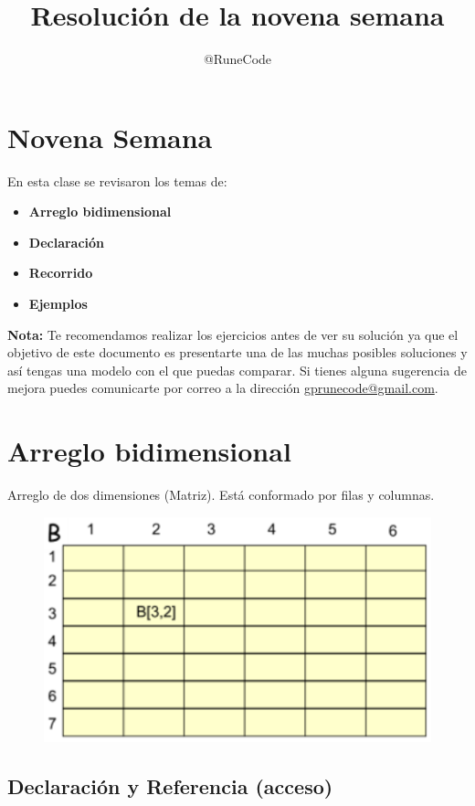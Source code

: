 \documentclass{article}
\title{Resolución de la novena semana}
\author{@RuneCode}
\begin{document}



\section*{Novena Semana}%
En esta clase se revisaron los temas de:
\begin{itemize}
\item \textbf{Arreglo bidimensional}
\item \textbf{Declaración}
\item \textbf{Recorrido}
\item \textbf{Ejemplos}
\end{itemize}
\vspace{1cm}
\textbf{Nota:} Te recomendamos realizar los ejercicios antes de ver su solución
ya que el objetivo de este documento es presentarte una de las muchas posibles
soluciones y así tengas una modelo con el que puedas comparar. Si tienes alguna
sugerencia de mejora puedes comunicarte por correo a la dirección
\href{mailto:gprunecode@gmail.com}{gprunecode@gmail.com}.


\section{Arreglo bidimensional}%
Arreglo de dos dimensiones (Matriz). Está conformado por filas y columnas.

\begin{figure}[h!]
  \centering
  \includegraphics[scale=0.75]{./pictures/arreglo_bidimensional.png}
\end{figure}

\subsection*{Declaración y Referencia (acceso)}%
\end{document}
